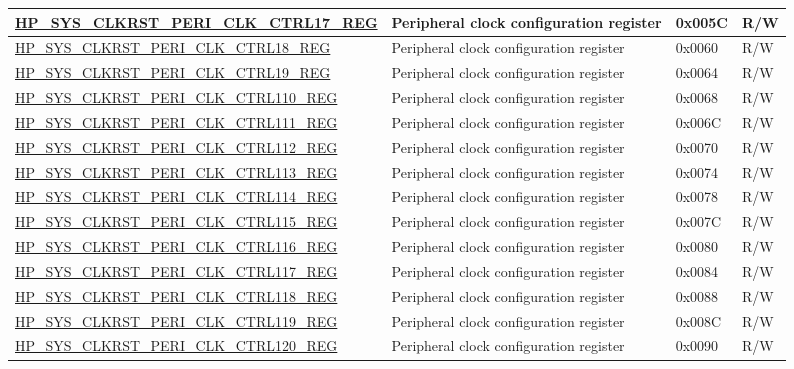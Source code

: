 \begin{longtable}{ | p{7.5cm} | p{6.2cm} | p{1.3cm} | p{1cm} | }
\hyperref[regdesc:HPSYSCLKRSTPERICLKCTRL17REG]{HP\_SYS\_CLKRST\_PERI\_CLK\_CTRL17\_REG} & Peripheral clock configuration register  & 0x005C & R/W \\ \hline
\hyperref[regdesc:HPSYSCLKRSTPERICLKCTRL18REG]{HP\_SYS\_CLKRST\_PERI\_CLK\_CTRL18\_REG} & Peripheral clock configuration register  & 0x0060 & R/W \\ \hline
\hyperref[regdesc:HPSYSCLKRSTPERICLKCTRL19REG]{HP\_SYS\_CLKRST\_PERI\_CLK\_CTRL19\_REG} & Peripheral clock configuration register  & 0x0064 & R/W \\ \hline
\hyperref[regdesc:HPSYSCLKRSTPERICLKCTRL110REG]{HP\_SYS\_CLKRST\_PERI\_CLK\_CTRL110\_REG} & Peripheral clock configuration register  & 0x0068 & R/W \\ \hline
\hyperref[regdesc:HPSYSCLKRSTPERICLKCTRL111REG]{HP\_SYS\_CLKRST\_PERI\_CLK\_CTRL111\_REG} & Peripheral clock configuration register  & 0x006C & R/W \\ \hline
\hyperref[regdesc:HPSYSCLKRSTPERICLKCTRL112REG]{HP\_SYS\_CLKRST\_PERI\_CLK\_CTRL112\_REG} & Peripheral clock configuration register  & 0x0070 & R/W \\ \hline
\hyperref[regdesc:HPSYSCLKRSTPERICLKCTRL113REG]{HP\_SYS\_CLKRST\_PERI\_CLK\_CTRL113\_REG} & Peripheral clock configuration register  & 0x0074 & R/W \\ \hline
\hyperref[regdesc:HPSYSCLKRSTPERICLKCTRL114REG]{HP\_SYS\_CLKRST\_PERI\_CLK\_CTRL114\_REG} & Peripheral clock configuration register  & 0x0078 & R/W \\ \hline
\hyperref[regdesc:HPSYSCLKRSTPERICLKCTRL115REG]{HP\_SYS\_CLKRST\_PERI\_CLK\_CTRL115\_REG} & Peripheral clock configuration register  & 0x007C & R/W \\ \hline
\hyperref[regdesc:HPSYSCLKRSTPERICLKCTRL116REG]{HP\_SYS\_CLKRST\_PERI\_CLK\_CTRL116\_REG} & Peripheral clock configuration register  & 0x0080 & R/W \\ \hline
\hyperref[regdesc:HPSYSCLKRSTPERICLKCTRL117REG]{HP\_SYS\_CLKRST\_PERI\_CLK\_CTRL117\_REG} & Peripheral clock configuration register  & 0x0084 & R/W \\ \hline
\hyperref[regdesc:HPSYSCLKRSTPERICLKCTRL118REG]{HP\_SYS\_CLKRST\_PERI\_CLK\_CTRL118\_REG} & Peripheral clock configuration register  & 0x0088 & R/W \\ \hline
\hyperref[regdesc:HPSYSCLKRSTPERICLKCTRL119REG]{HP\_SYS\_CLKRST\_PERI\_CLK\_CTRL119\_REG} & Peripheral clock configuration register  & 0x008C & R/W \\ \hline
\hyperref[regdesc:HPSYSCLKRSTPERICLKCTRL120REG]{HP\_SYS\_CLKRST\_PERI\_CLK\_CTRL120\_REG} & Peripheral clock configuration register  & 0x0090 & R/W \\ \hline

\end{longtable}

